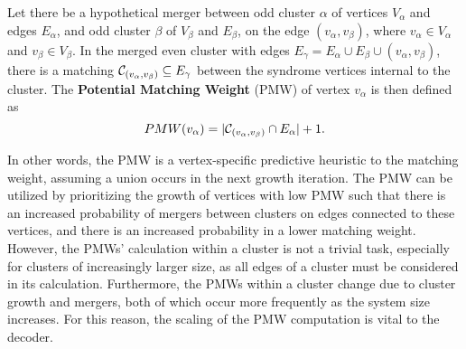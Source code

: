 \begin{definition}\label{def:pmw}
    Let there be a hypothetical merger between odd cluster $\alpha$ of vertices $V_\alpha$ and edges $E_\alpha$, and odd cluster $\beta$ of $V_\beta$ and $E_\beta$, on the edge $(v_\alpha, v_\beta)$, where $v_\alpha \in V_\alpha$ and $v_\beta \in V_\beta$. In the merged even cluster with edges $E_{\gamma} = E_\alpha \cup E_\beta \cup (v_\alpha, v_\beta)$, there is a matching $\mathcal{C}_{(v_\alpha,v_\beta)} \subseteq E_{\gamma}$  between the syndrome vertices internal to the cluster. The \textbf{Potential Matching Weight} (PMW) of vertex $v_\alpha$ is then defined as
    \begin{equation}
      PMW(v_\alpha) = \lvert\mathcal{C}_{(v_\alpha,v_\beta)} \cap E_\alpha\rvert + 1.
    \end{equation}
\end{definition}

In other words, the PMW is a vertex-specific predictive heuristic to the matching weight, assuming a union occurs in the next growth iteration. The PMW can be utilized by prioritizing the growth of vertices with low PMW such that there is an increased probability of mergers between clusters on edges connected to these vertices, and there is an increased probability in a lower matching weight. However, the PMWs' calculation within a cluster is not a trivial task, especially for clusters of increasingly larger size, as all edges of a cluster must be considered in its calculation. Furthermore, the PMWs within a cluster change due to cluster growth and mergers, both of which occur more frequently as the system size increases. For this reason, the scaling of the PMW computation is vital to the decoder. 

